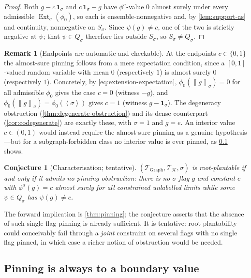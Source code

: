 \documentclass[11pt]{article}
\newtheorem{conjecture}[theorem]{Conjecture}
\theoremstyle{definition}
\newtheorem{remark}[theorem]{Remark}
\newcommand{\K}{\mathcal{K}}
\newcommand{\T}{\mathcal{T}}
\newcommand{\Ext}{\operatorname{Ext}}
\newcommand{\brak}[1]{\left\langle #1\right\rangle}
\newcommand{\avg}[2]{\left\llbracket #1 \right\rrbracket_{#2}}
\newcommand{\one}{\mathbf 1}
\begin{document}
\begin{proof}
Both $g-c\,\one_\sigma$ and $c\,\one_\sigma-g$ have $\phi^\sigma$-value $0$ almost surely
under every admissible $\Ext_\sigma(\phi_0)$, so each is ensemble-nonnegative and,
by \cref{lem:support-as} and continuity, nonnegative on $S_\sigma$.  Since
$\psi(g)\ne c$, one of the two is strictly negative at $\psi$; that
$\psi\in Q_\sigma$ therefore lies outside $S_\sigma$, so $S_\sigma\ne Q_\sigma$.
\end{proof}

\begin{remark}[Endpoints are automatic and checkable]
At the endpoints $c\in\{0,1\}$ the almost-sure pinning follows from a mere
expectation condition, since a $[0,1]$-valued random variable with mean $0$
(respectively $1$) is almost surely $0$ (respectively $1$).  Concretely, by
\eqref{eq:extension-expectation}, $\phi_0(\avg{g}{\sigma})=0$ for all admissible
$\phi_0$ gives the case $c=0$ (witness $-g$), and
$\phi_0(\avg{g}{\sigma})=\phi_0(\brak\sigma)$ gives $c=1$ (witness $g-\one_\sigma$).  The
degeneracy obstruction (\cref{thm:degenerate-obstruction}) and its dense
counterpart (\cref{cor:codegenerate}) are exactly these, with $\sigma=1$ and
$g=e$.  An interior value $c\in(0,1)$ would instead require the almost-sure pinning as a
genuine hypothesis---but for a subgraph-forbidden class no interior value is ever pinned,
as \cref{subsec:boundary} shows.
\end{remark}

\begin{conjecture}[Characterisation; tentative]\label{conj:characterisation}
$(\T_{\mathrm{Graph}},\T_\K,\sigma)$ is root-plantable if and only if it admits no
pinning obstruction: there is no $\sigma$-flag $g$ and constant $c$ with
$\phi^\sigma(g)=c$ almost surely for all constrained unlabelled limits while some
$\psi\in Q_\sigma$ has $\psi(g)\ne c$.
\end{conjecture}

The forward implication is \cref{thm:pinning}; the conjecture asserts that the
absence of such single-flag pinning is already sufficient.  It is tentative:
root-plantability could conceivably fail through a \emph{joint} constraint on several
flags with no single flag pinned, in which case a richer notion of obstruction would
be needed.

\subsection{Pinning is always to a boundary value}\label{subsec:boundary}
\end{document}
